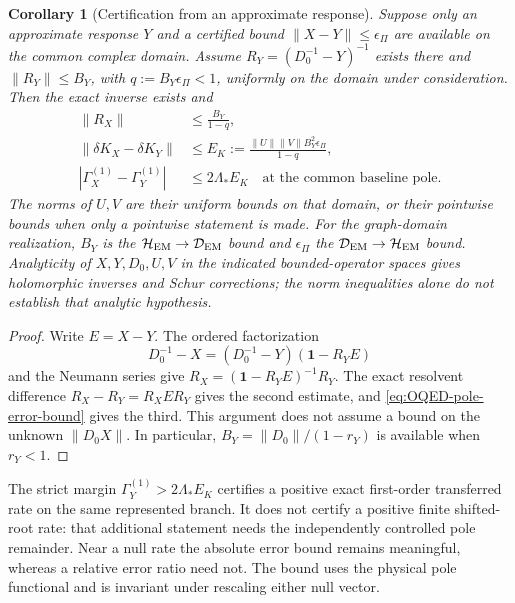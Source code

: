 \documentclass[final,5p,times,twocolumn,numbers,nopreprintline]{elsarticle}
\numberwithin{equation}{section}
\newtheorem{corollary}[theorem]{Corollary}
\theoremstyle{definition}
\theoremstyle{remark}
\newcommand{\one}{\mathbf 1}
\begin{document}
\begin{corollary}[Certification from an approximate response]
\label{cor:OQED-aposteriori-Schur}
Suppose only an approximate response \(Y\) and a certified bound
\(\|X-Y\|\leq\epsilon_\Pi\) are available on the common complex domain.
Assume \(R_Y=(D_0^{-1}-Y)^{-1}\) exists there and
\(\|R_Y\|\leq B_Y\), with \(q:=B_Y\epsilon_\Pi<1\), uniformly on
the domain under consideration. Then the exact inverse exists and
\begin{equation}
\begin{aligned}
 \|R_X\|&\leq\frac{B_Y}{1-q},\\
 \|\delta K_X-\delta K_Y\|
       &\leq E_K:=\frac{\|U\|\|V\|B_Y^2\epsilon_\Pi}{1-q},\\
 |\Gamma_X^{(1)}-\Gamma_Y^{(1)}|&\leq2\Lambda_*E_K
                 \quad\text{at the common baseline pole}.
\end{aligned}
\label{eq:OQED-aposteriori-Schur}
\end{equation}
The norms of \(U,V\) are their uniform bounds on that domain, or
their pointwise bounds when only a pointwise statement is made.
For the graph-domain realization, \(B_Y\) is the
\(\mathcal H_{\rm EM}\to\mathcal D_{\rm EM}\) bound and
\(\epsilon_\Pi\) the \(\mathcal D_{\rm EM}\to\mathcal H_{\rm EM}\)
bound. Analyticity of \(X,Y,D_0,U,V\) in the indicated bounded-operator
spaces gives holomorphic inverses and Schur corrections; the norm
inequalities alone do not establish that analytic hypothesis.
\end{corollary}
\begin{proof}
Write \(E=X-Y\). The ordered factorization
\[
 D_0^{-1}-X=(D_0^{-1}-Y)(\one-R_YE)
\]
and the Neumann series give
\(R_X=(\one-R_YE)^{-1}R_Y\). The exact resolvent difference
\(R_X-R_Y=R_X E R_Y\) gives the second estimate, and
\eqref{eq:OQED-pole-error-bound} gives the third. This argument does
not assume a bound on the unknown \(\|D_0X\|\). In particular,
\(B_Y=\|D_0\|/(1-r_Y)\) is available when \(r_Y<1\).
\end{proof}

The strict margin \(\Gamma_Y^{(1)}>2\Lambda_*E_K\) certifies a
positive exact first-order transferred rate on the same represented
branch. It does not certify a positive finite shifted-root rate:
that additional statement needs the independently controlled pole
remainder. Near a null rate the absolute error bound remains meaningful,
whereas a relative error ratio need not. The bound uses the physical
pole functional and is invariant under rescaling either null vector.
\end{document}
